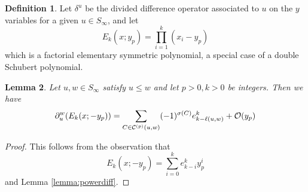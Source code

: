 \documentclass{amsart}
\newtheorem{lemma}{Lemma}[subsection]
\theoremstyle{definition}
\newtheorem{definition}[lemma]{Definition}
\theoremstyle{remark}
\numberwithin{equation}{subsection}
\begin{document}
\begin{definition}
Let $\delta^u$ be the divided difference operator associated to $u$ on the $y$ variables for a given $u\in S_\infty$, and let 
$$E_k(x;y_p)=\prod_{i=1}^k (x_i - y_p)$$
which is a factorial elementary symmetric polynomial, a special case of a double Schubert polynomial.
\end{definition}

\begin{lemma} \label{lemma:doublediff}
  Let $u,w\in S_\infty$ satisfy $u\leq w$ and let $p>0,k>0$ be integers. Then we have
  $$\partial_u^w(E_k(x;-y_p))=\sum_{C\in\mathcal{C}^{(p)}(u,w)}(-1)^{\sigma(C)}e_{k-\ell(u,w)}^k+\mathcal{O}(y_p)$$
\end{lemma}

\begin{proof}
This follows from the observation that
$$E_k(x;-y_p) = \sum_{i=0}^k e_{k-i}^k y_p^i$$
and Lemma \ref{lemma:powerdiff}.
\end{proof}
\end{document}
